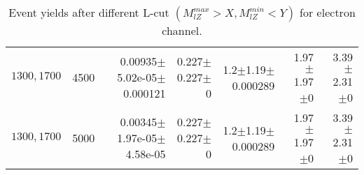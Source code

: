 \documentclass[]{article}
\begin{document}
\begin{table}
\begin{center}
{\begin{tabular}{ |r|r|r|r|r|r|r|}
$1300, 1700$ & 4500 & 0.00935$\pm$5.02e-05$\pm$0.000121 & 0.227$\pm$0.227$\pm$0 & 1.2$\pm$1.19$\pm$0.000289 & 1.97$\pm$1.97$\pm$0 & 3.39$\pm$2.31$\pm$0 \\
$1300, 1700$ & 5000 & 0.00345$\pm$1.97e-05$\pm$4.58e-05 & 0.227$\pm$0.227$\pm$0 & 1.2$\pm$1.19$\pm$0.000289 & 1.97$\pm$1.97$\pm$0 & 3.39$\pm$2.31$\pm$0 \\
\hline 
\end{tabular}
}
\end{center}
\caption{Event yields after different L-cut $(M_{lZ}^{max} > X, M_{lZ}^{min} < Y)$ for electron channel.}
\end{table}
\end{document}
